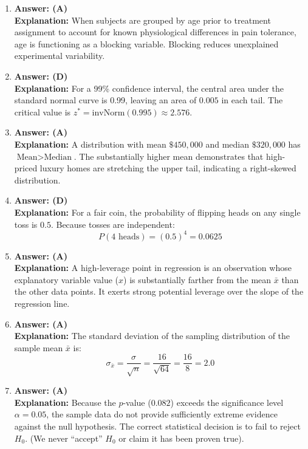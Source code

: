 \begin{enumerate}[leftmargin=1.5em]
  \item \textbf{Answer: (A)} \\
  \textbf{Explanation:} When subjects are grouped by age prior to treatment assignment to account for known physiological differences in pain tolerance, age is functioning as a blocking variable. Blocking reduces unexplained experimental variability.

  \item \textbf{Answer: (D)} \\
  \textbf{Explanation:} For a 99\% confidence interval, the central area under the standard normal curve is 0.99, leaving an area of $0.005$ in each tail. The critical value is $z^* = \text{invNorm}(0.995) \approx 2.576$.

  \item \textbf{Answer: (A)} \\
  \textbf{Explanation:} A distribution with mean $\$450,000$ and median $\$320,000$ has $\text{Mean} > \text{Median}$. The substantially higher mean demonstrates that high-priced luxury homes are stretching the upper tail, indicating a right-skewed distribution.

  \item \textbf{Answer: (D)} \\
  \textbf{Explanation:} For a fair coin, the probability of flipping heads on any single toss is $0.5$. Because tosses are independent:
  \[ P(4\text{ heads}) = (0.5)^4 = 0.0625 \]

  \item \textbf{Answer: (A)} \\
  \textbf{Explanation:} A high-leverage point in regression is an observation whose explanatory variable value ($x$) is substantially farther from the mean $\bar{x}$ than the other data points. It exerts strong potential leverage over the slope of the regression line.

  \item \textbf{Answer: (A)} \\
  \textbf{Explanation:} The standard deviation of the sampling distribution of the sample mean $\bar{x}$ is:
  \[ \sigma_{\bar{x}} = \frac{\sigma}{\sqrt{n}} = \frac{16}{\sqrt{64}} = \frac{16}{8} = 2.0 \]

  \item \textbf{Answer: (A)} \\
  \textbf{Explanation:} Because the $p$-value ($0.082$) exceeds the significance level $\alpha = 0.05$, the sample data do not provide sufficiently extreme evidence against the null hypothesis. The correct statistical decision is to fail to reject $H_0$. (We never ``accept'' $H_0$ or claim it has been proven true).


\end{enumerate}
